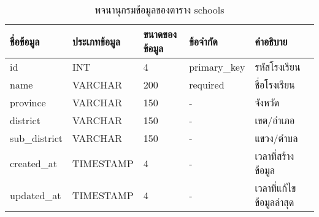 \begin{table}[H]
    \caption{พจนานุกรมข้อมูลของตาราง schools}
    \label{tab:database-schools}
    \begin{tabularx}{\textwidth}{ | p{2.25cm} | p{2.20cm} | p{2.45cm} | p{2.15cm} | X | }
    \hline
    \textbf{ชื่อข้อมูล} & \textbf{ประเภทข้อมูล} & \textbf{ขนาดของข้อมูล} & \textbf{ข้อจำกัด} & \textbf{คำอธิบาย} \\
    \hline
    id & INT & 4 & primary\_key & รหัสโรงเรียน \\
    \hline
    name & VARCHAR & 200 & required & ชื่อโรงเรียน \\
    \hline
    province & VARCHAR & 150 & - & จังหวัด \\
    \hline
    district & VARCHAR & 150 & - & เขต/อำเภอ \\
    \hline
    sub\_district & VARCHAR & 150 & - & แขวง/ตำบล \\
    \hline
    created\_at & TIMESTAMP & 4 & - & เวลาที่สร้างข้อมูล \\
    \hline
    updated\_at & TIMESTAMP & 4 & - & เวลาที่แก้ไขข้อมูลล่าสุด \\
    \hline
    \end{tabularx}
\end{table}
